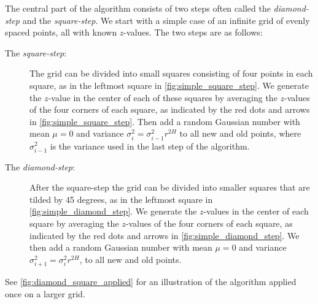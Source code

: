 The central part of the algorithm consists of two steps often called the \emph{diamond-step} and the \emph{square-step}. We start with a simple case of an infinite grid of evenly spaced points, all with known $z$-values. The two steps are as follows:
\begin{description}
    \item[The \emph{square-step}:] The grid can be divided into small squares consisting of four points in each square, as in the leftmost square in \cref{fig:simple_square_step}. We generate the $z$-value in the center of each of these squares by averaging the $z$-values of the four corners of each square, as indicated by the red dots and arrows in \cref{fig:simple_square_step}. Then add a random Gaussian number with mean $\mu = 0$ and variance $\sigma_i^2 = \sigma_{i-1}^2r^{2H}$ to all new and old points, where $\sigma_{i-1}^2$ is the variance used in the last step of the algorithm.
    \label{enum:test}
    
    \item[The \emph{diamond-step}:] After the square-step the grid can be divided into smaller squares that are tilded by 45 degrees, as in the leftmost square in \cref{fig:simple_diamond_step}. We generate the $z$-values in the center of each square by averaging the $z$-values of the four corners of each square, as indicated by the red dots and arrows in \cref{fig:simple_diamond_step}. We then add a random Gaussian number with mean $\mu = 0$ and variance $\sigma_{i+1}^2 = \sigma_i^2r^{2H}$, to all new and old points. 
\end{description}
See \cref{fig:diamond_square_applied} for an illustration of the algorithm applied once on a larger grid. 

